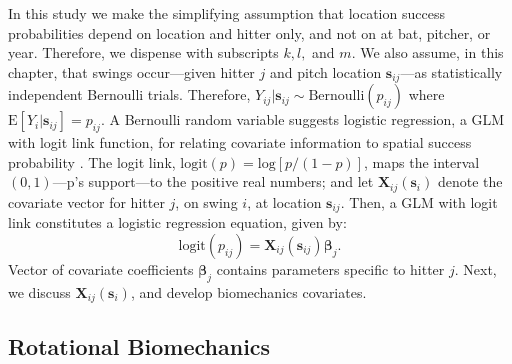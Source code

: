 In this study we make the simplifying assumption that location success probabilities depend on location and hitter only, and not on at bat, pitcher, or year. Therefore, we dispense with subscripts $k, l,$ and $m$. We also assume, in this chapter, that swings occur---given hitter $j$ and pitch location $\pmb{s}_{ij}$---as statistically independent Bernoulli trials. Therefore, $Y_{ij}|\pmb{s}_{ij} \sim \text{Bernoulli}(p_{ij})$ where $\text{E}[Y_{i}|\pmb{s}_{ij}] = p_{ij}$. A Bernoulli random variable suggests logistic regression, a GLM with logit link function, for relating covariate information to spatial success probability \citep{Myers2012}. The logit link, $\text{logit}(p) = \text{log}\left[p/(1-p)\right]$, maps the interval $(0,1)$---p's support---to the positive real numbers; and let  $\pmb{X}_{ij}(\pmb{s}_{i})$ denote the covariate vector for hitter $j$, on swing $i$, at location $\pmb{s}_{ij}$. Then, a GLM with logit link constitutes a logistic regression equation, given by: 
\begin{equation}
\text{logit}(p_{ij}) = \pmb{X}_{ij}(\pmb{s}_{ij}) \pmb{\beta}_{j}.
\end{equation}
Vector of covariate coefficients $\pmb{\beta}_{j}$ contains parameters specific to hitter $j$. Next, we discuss $\pmb{X}_{ij}(\pmb{s}_{i})$, and develop biomechanics covariates.

\subsection{Rotational Biomechanics} %

